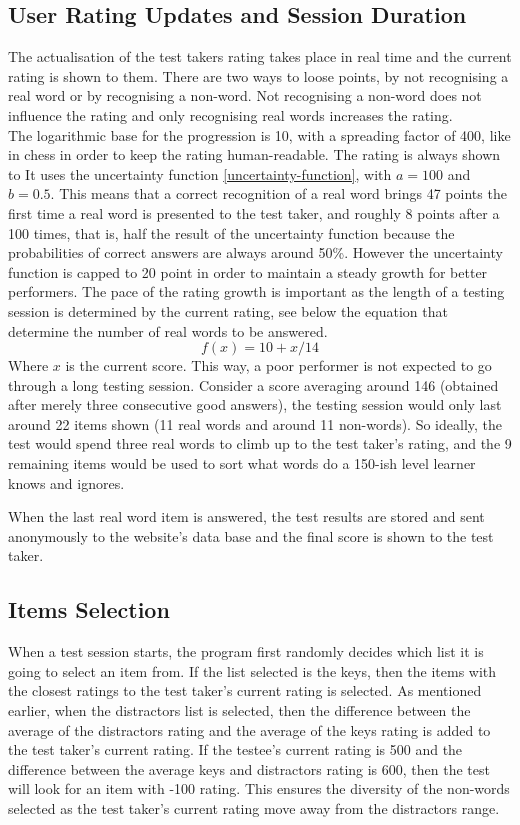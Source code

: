     \subsection{User Rating Updates and Session Duration}
The actualisation of the test takers rating takes place in real time and the current rating is shown to them. There are two ways to loose points, by not recognising a real word or by recognising a non-word. Not recognising a non-word does not influence the rating and only recognising real words increases the rating.\\
The logarithmic base for the progression is 10, with a spreading factor of 400, like in chess in order to keep the rating human-readable. The rating is always shown to  It uses the uncertainty function \ref{uncertainty-function}, with $a=100$ and $b=0.5$. This means that a correct recognition of a real word brings 47 points the first time a real word is presented to the test taker, and roughly 8 points after a 100 times, that is, half the result of the uncertainty function because the probabilities of correct answers are always around 50\%. However the uncertainty function is capped to 20 point in order to maintain a steady growth for better performers. The pace of the rating growth is important as the length of a testing session is determined by the current rating, see below the equation that determine the number of real words to be answered.
\begin{equation}
    f(x)=10 + x/14
\end{equation}\label{length-function}
Where $x$ is the current score. This way, a poor performer is not expected to go through a long testing session. Consider a score averaging around 146 (obtained after merely three consecutive good answers), the testing session would only last around 22 items shown (11 real words and around 11 non-words). So ideally, the test would spend three real words to climb up to the test taker's rating, and the 9 remaining items would be used to sort what words do a 150-ish level learner knows and ignores.

When the last real word item is answered, the test results are stored and sent anonymously to the website's data base and the final score is shown to the test taker.

\subsection{Items Selection}
When a test session starts, the program first randomly decides which list it is going to select an item from. If the list selected is the keys, then the items with the closest ratings to the test taker's current rating is selected. As mentioned earlier, when the distractors list is selected, then the difference between the average of the distractors rating and the average of the keys rating is added to the test taker's current rating. If the testee's current rating is 500 and the difference between the average keys and distractors rating is 600, then the test will look for an item with -100 rating. This ensures the diversity of the non-words selected as the test taker's current rating move away from the distractors range.

